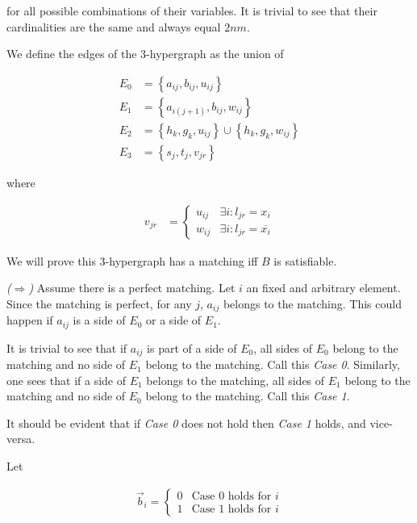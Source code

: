 \documentclass[a4paper]{article}
\begin{document}
for all possible combinations of their variables. It is trivial to see that
their cardinalities are the same and always equal $2nm$.

We define the edges of the 3-hypergraph as the union of

\begin{align*}
    E_0 &= \left\{ a_{ij}, b_{ij}, u_{ij} \right\} \\ 
    E_1 &= \left\{ a_{i(j+1)}, b_{ij}, w_{ij} \right\} \\ 
    E_2&= \left\{ h_{k}, g_k, u_{ij} \right\} \cup \left\{ h_k, g_k, w_{ij} \right\} \\ 
    E_3 &= \left\{ s_j, t_j, v_{jr} \right\} 
\end{align*}

where 

\begin{align*}
    v_{jr} &= \begin{cases}
        u_{ij} & \exists i : l_{jr} = x_i \\ 
        w_{ij} & \exists i: l_{jr} = \overline{x_i}
    \end{cases}
\end{align*}

We will prove this 3-hypergraph has a matching iff $B$ is satisfiable.

\textit{($\Rightarrow$)} Assume there is a perfect matching. Let $i$ an fixed and 
arbitrary element. Since the matching is perfect, for any $j$,
$a_{ij}$ belongs to the matching. This could happen if $a_{ij}$ is 
a side of $E_0$ or a side of $E_1$. 

It is trivial to see that if $a_{ij}$ is part of a side of $E_0$, all sides of
$E_0$ belong to the matching and no side of $E_1$ belong to the matching. Call
this \textit{Case 0}. Similarly, one sees that if a side of $E_1$ belongs to
the matching, all sides of $E_1$ belong to the matching and no side of $E_0$
belong to the matching. Call this \textit{Case 1}. 

It should be evident that if \textit{Case 0} does
not hold then \textit{Case 1} holds, and vice-versa.

Let 

\begin{align*}
    \overrightarrow{b}_i = \begin{cases}
        0 & \text{Case 0 holds for }i \\ 
        1 & \text{Case 1 holds for }i
    \end{cases}
\end{align*}
\end{document}
